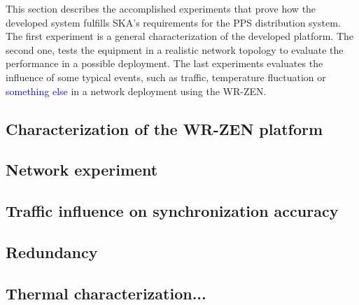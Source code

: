 
This section describes the accomplished experiments that prove how the 
developed system fulfills SKA's requirements for the PPS distribution system. The first experiment 
is a general characterization of the developed platform. The second one, tests the equipment in a 
realistic network topology to evaluate the performance in a possible deployment. The last experiments 
evaluates the influence of some typical events, such as traffic, temperature fluctuation or \textcolor{blue}{something else} in a network deployment using the WR-ZEN.

\subsection{Characterization of the WR-ZEN platform}
\label{subsec: charact_zen}


\subsection{Network experiment} %
\label{subsec: net_exp}


\subsection{Traffic influence on synchronization accuracy}


\subsection{Redundancy}


\subsection{Thermal characterization...}


 
